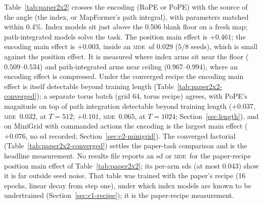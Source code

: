 \documentclass[10pt]{article}
\newcommand{\mde}{\textsc{mde}}
\begin{document}
Table~\ref{tab:paper2x2} crosses the encoding (RoPE or PoPE) with the source of the angle (the index,
or MapFormer's path integral), with parameters matched within 0.4\%. Index models sit just above the
0.506 blank floor on a fresh map; path-integrated models solve the task. The position main effect is
$+0.461$; the encoding main effect is $+0.003$, inside an \mde\ of $0.029$ ($5/8$ seeds), which is
small against the position effect. It is measured where index arms sit near the floor ($0.509$--$0.534$) and
path-integrated arms near ceiling ($0.967$--$0.994$), where an encoding effect is compressed. Under the
converged recipe the encoding main effect is itself detectable beyond training length
(Table~\ref{tab:paper2x2-converged}); a separate torus batch (grid 64, torus recipe) agrees, with PoPE's
magnitude on top of path integration detectable beyond training length ($+0.037$, \mde\ $0.032$, at $T=512$; $+0.101$, \mde\ $0.065$, at
$T=1024$; Section~\ref{sec:length}), and on MiniGrid with commanded actions the encoding is the largest main
effect ($+0.076$, no sd recorded; Section~\ref{sec:c2-minigrid}). The converged factorial (Table~\ref{tab:paper2x2-converged}) settles the paper-task comparison and is
the headline measurement. No results file reports an sd or \mde\ for the paper-recipe position main effect of
Table~\ref{tab:paper2x2}; its per-arm sds (at most 0.043) show it is far outside seed noise. That table was trained with the
paper's recipe (16 epochs, linear decay from step one), under which index models are known to be
undertrained (Section~\ref{sec:c1-recipe}); it is the paper-recipe measurement.
\end{document}
